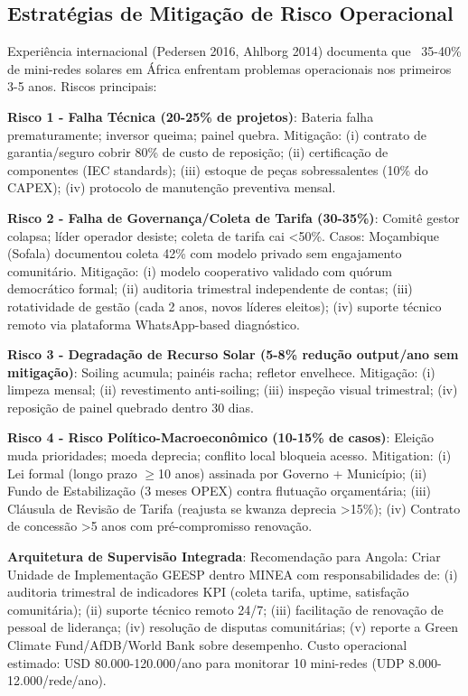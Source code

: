 \documentclass[12pt, a4paper]{article}
\begin{document}
\subsection{Estratégias de Mitigação de Risco Operacional}

Experiência internacional (Pedersen 2016, Ahlborg 2014) documenta que ~35-40\% de mini-redes solares em África enfrentam problemas operacionais nos primeiros 3-5 anos. Riscos principais:

\textbf{Risco 1 - Falha Técnica (20-25\% de projetos)}: Bateria falha prematuramente; inversor queima; painel quebra. Mitigação: (i) contrato de garantia/seguro cobrir 80\% de custo de reposição; (ii) certificação de componentes (IEC standards); (iii) estoque de peças sobressalentes (10\% do CAPEX); (iv) protocolo de manutenção preventiva mensal.

\textbf{Risco 2 - Falha de Governança/Coleta de Tarifa (30-35\%)}: Comitê gestor colapsa; líder operador desiste; coleta de tarifa cai <50\%. Casos: Moçambique (Sofala) documentou coleta 42\% com modelo privado sem engajamento comunitário. Mitigação: (i) modelo cooperativo validado com quórum democrático formal; (ii) auditoria trimestral independente de contas; (iii) rotatividade de gestão (cada 2 anos, novos líderes eleitos); (iv) suporte técnico remoto via plataforma WhatsApp-based diagnóstico.

\textbf{Risco 3 - Degradação de Recurso Solar (5-8\% redução output/ano sem mitigação)}: Soiling acumula; painéis racha; refletor envelhece. Mitigação: (i) limpeza mensal; (ii) revestimento anti-soiling; (iii) inspeção visual trimestral; (iv) reposição de painel quebrado dentro 30 dias.

\textbf{Risco 4 - Risco Político-Macroeconômico (10-15\% de casos)}: Eleição muda prioridades; moeda deprecia; conflito local bloqueia acesso. Mitigation: (i) Lei formal (longo prazo $\geq$10 anos) assinada por Governo + Município; (ii) Fundo de Estabilização (3 meses OPEX) contra flutuação orçamentária; (iii) Cláusula de Revisão de Tarifa (reajusta se kwanza deprecia >15\%); (iv) Contrato de concessão >5 anos com pré-compromisso renovação.

\textbf{Arquitetura de Supervisão Integrada}: Recomendação para Angola: Criar Unidade de Implementação GEESP dentro MINEA com responsabilidades de: (i) auditoria trimestral de indicadores KPI (coleta tarifa, uptime, satisfação comunitária); (ii) suporte técnico remoto 24/7; (iii) facilitação de renovação de pessoal de liderança; (iv) resolução de disputas comunitárias; (v) reporte a Green Climate Fund/AfDB/World Bank sobre desempenho. Custo operacional estimado: USD 80.000-120.000/ano para monitorar 10 mini-redes (UDP 8.000-12.000/rede/ano).
\end{document}
